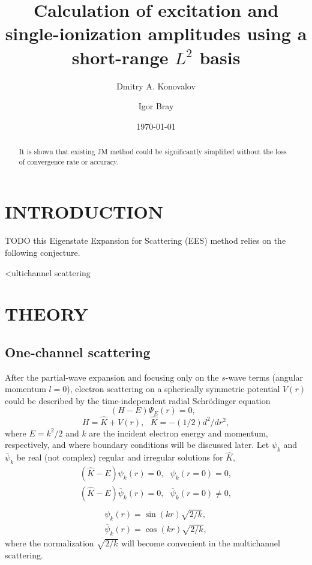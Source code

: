 \documentclass[aip
, pra
, showpacs
, aps
, twocolumn
, groupedaddress
, floatfix
]{revtex4}
\newcommand{\beq}{\begin{equation}}
\newcommand{\eeq}{\end{equation}}
\newcommand{\barr}{\begin{array}}
\newcommand{\earr}{\end{array}}
\begin{document}
\title {Calculation of excitation and single-ionization amplitudes using a short-range $L^2$ basis}

\author{Dmitry A. Konovalov}

\author{Igor Bray}


\date{\today}

\begin{abstract}
It is shown that existing JM method could be significantly simplified without the loss of convergence rate or accuracy.

\end{abstract}

\maketitle

\section{INTRODUCTION}
TODO
this Eigenstate Expansion for Scattering (EES) method relies on the following conjecture.

<ultichannel scattering \cite{CA73, NO72, TF79, Nesbet78, Lucchese86}

\section{THEORY}
\subsection{One-channel scattering}


After the partial-wave expansion \cite{Taylor72,N82} and focusing only on the $s$-wave terms (angular momentum $l=0$),
electron scattering on a spherically symmetric potential $V(r)$
could be described by the time-independent radial Schr\"odinger equation
\beq
(H-E) \Psi_E (r) =0,  \ \ \  \label{H_E_Psi_E}
\eeq
\beq
H = \hat{K} + V(r), \ \ \ \hat{K} = -(1/2) d^2/dr^2,
\eeq
where $E=k^2/2$ and $k$ are the incident electron energy and momentum, respectively, and where boundary conditions will be discussed later.
Let $\psi_k$ and $\overline{\psi}_k$ be real (not complex) regular and irregular solutions for $\hat{K}$,
\beq \barr{l}
(\hat{K}-E)  \psi_k (r) =0,  \ \ \ \psi_k(r=0) = 0,\\
(\hat{K}-E)  \overline{\psi}_k (r) =0,  \ \ \ \overline{\psi}_k(r=0) \neq 0,\\
\earr \label{H_0_E_psi}\eeq
\beq \barr{l}
\psi_k(r) = \sin(kr) \sqrt{2/k},\\
\overline{\psi}_k(r) = \cos(kr) \sqrt{2/k},
\earr \label{K} \eeq
where the normalization $\sqrt{2/k}$ will become convenient in the multichannel scattering.
\end{document}
